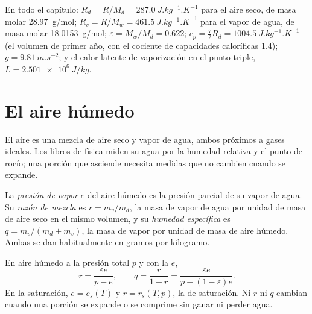 En todo el capítulo: $R_d = R/M_d = \qty{287.0}{J.kg^{-1}.K^{-1}}$ para el aire seco, de masa molar
\qty{28.97}{g/mol}; $R_v = R/M_w = \qty{461.5}{J.kg^{-1}.K^{-1}}$ para el vapor de agua, de masa
molar \qty{18.0153}{g/mol}; $\varepsilon = M_w/M_d = 0.622$; $c_p = \tfrac72 R_d =
\qty{1004.5}{J.kg^{-1}.K^{-1}}$ (el volumen de primer año, con el cociente de capacidades caloríficas 1.4);
$g = \qty{9.81}{m.s^{-2}}$; y el calor latente de vaporización en el punto triple,
$L = \qty{2.501e6}{J/kg}$.

\section{El aire húmedo}\label{sec:b2:atmospheric-thermodynamics:moist-air}

El aire es una mezcla de aire seco y vapor de agua, ambos próximos a gases ideales. Los libros de física
miden su agua por la humedad relativa y el punto de rocío; una porción que asciende necesita medidas
que no cambien cuando se expande.

\begin{definition}\label{def:b2:atmospheric-thermodynamics:moist-air}
La \emph{presión de vapor} $e$ del aire húmedo es la presión parcial de
su vapor de agua. Su \emph{razón de mezcla} es $r = m_v/m_d$, la masa de vapor
de agua por unidad de masa de aire seco en el mismo volumen, y su \emph{humedad
específica} es $q = m_v/(m_d + m_v)$, la masa de vapor por unidad de masa de
aire húmedo. Ambas se dan habitualmente en gramos por kilogramo.
\end{definition}

\begin{proposition}\label{prop:b2:atmospheric-thermodynamics:humidity}
En aire húmedo a la presión total $p$ y con la  $e$,
\[
  r = \frac{\varepsilon e}{p - e}, \qquad q = \frac{r}{1 + r} = \frac{\varepsilon e}{p - (1 -
  \varepsilon)e} .
\]
En la saturación, $e = e_s(T)$ y $r = r_s(T, p)$, la  de saturación. Ni $r$ ni
$q$ cambian cuando una porción se expande o se comprime sin ganar ni perder agua.
\end{proposition}

